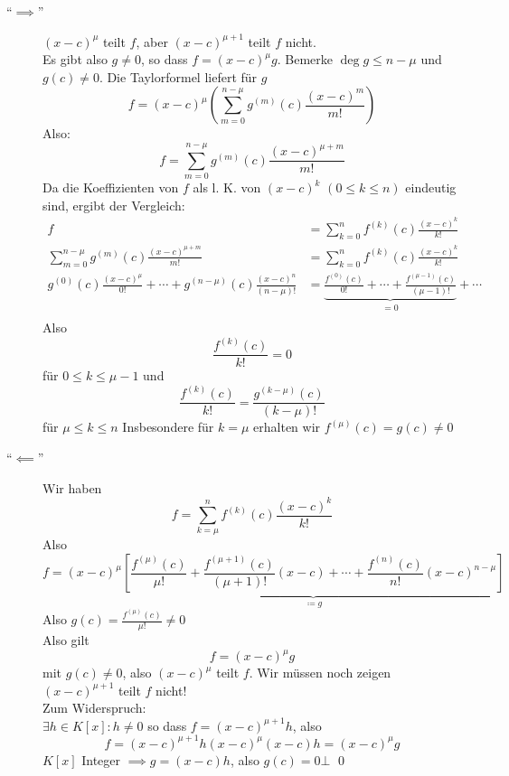 \begin{subproof*}
	\begin{description}
		\item[``$ \implies  $''] $ (x - c)^{\mu}  $ teilt $ f $, aber $ (x - c)^{\mu + 1}  $ teilt $ f $ nicht.\\
			Es gibt also $ g \neq 0 $, so dass $ f = (x - c)^{\mu} g $.
			Bemerke $ \deg g\leq n - \mu $ und $ g(c) \neq 0 $.
			Die Taylorformel liefert für $ g $
			\[
				f = (x - c)^{\mu} \left( \sum_{m=0}^{n - \mu} g^{(m)} (c) \frac{ ( x - c)^{m}  }{ m! } \right)
			\]
			Also:
			\[
				f = \sum_{m=0}^{n - \mu} g^{(m)} (c) \frac{ ( x - c )^{\mu + m} }{ m! } 
			\]
			Da die Koeffizienten von $ f $ als l. K. von $ (x - c)^k $ $ (0 \leq  k \leq n) $ eindeutig sind, ergibt der Vergleich:
			\begin{align*}
				f &= \sum_{k=0}^{n} f^{(k)} (c) \frac{ (x - c)^k }{ k! } \\
				\sum_{m=0}^{n - \mu} g^{(m)} (c) \frac{ ( x - c )^{\mu + m} }{ m! } 
				& = \sum_{k=0}^{n} f^{(k)} (c) \frac{ (x - c)^k }{ k! } \\
				g^{(0)} (c) \frac{ (x - c)^{\mu} }{ 0! } + \dotsb + g^{(n - \mu)} (c) \frac{ (x - c)^{n} }{ ( n - \mu )! } &= \underbrace{\frac{ f^{(0)} (c) }{ 0! } + \dotsb + \frac{ f^{(\mu - 1)} (c) }{ ( \mu - 1 )! } }_{ = 0 } + \dotsb \\
			\end{align*}
			Also
			\[ \frac{ f^{(k)} (c) }{ k! } = 0 \]
			für $ 0 \leq k \leq \mu - 1 $ und 
			\[
				\frac{ f^{(k)} (c) }{ k! } = \frac{ g^{( k - \mu)} (c) }{ ( k - \mu)! } 
			\]
			für $ \mu \leq k \leq n $ 
			Insbesondere für $ k = \mu $ erhalten wir $ f^{(\mu)} (c) = g(c) \neq 0 $
		\item[``$ \impliedby $''] Wir haben
			\[
				f = \sum_{k=\mu}^{n} f^{(k)} (c) \frac{ (x - c)^{k} }{ k! } 
			\]
			Also
			\[
				f = (x - c)^{\mu} \underbrace{\left[ \frac{ f^{(\mu)} (c) }{ \mu! } + \frac{ f^{(\mu + 1)} (c) }{ ( \mu + 1)! } (x - c) + \dotsb + \frac{ f^{(n)} (c) }{ n! } (x - c)^{n - \mu} \right]}_{ \coloneqq g}
			\]
			Also $ g(c) = \frac{ f^{(\mu)} (c) }{ \mu! } \neq 0 $\\
			Also gilt
			\[
				f = (x - c)^{\mu} g
			\]
			mit $ g(c) \neq 0 $, also $ ( x - c)^{\mu} $ teilt $ f $.
			Wir müssen noch zeigen $ ( x - c )^{\mu + 1}  $ teilt $ f $ nicht!\\
			Zum Widerspruch:\\
			$ \exists h \in K[x] : h \neq 0 $ so dass $ f = ( x - c )^{\mu + 1} h $, also
			\[
				f = ( x - c )^{\mu + 1} h  ( x - c) ^{\mu} (x - c) h = (x - c)^{\mu} g
			\]
			$ K[x] $ Integer $ \implies g = ( x - c )h $, also $ g(c) = 0 \bot $ \qed
	\end{description}
\end{subproof*}

